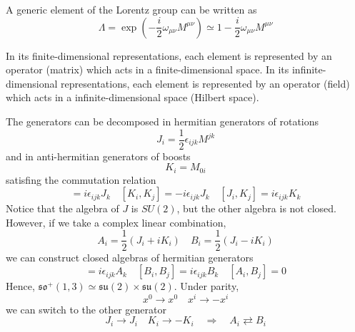     A generic element of the Lorentz group can be written as 
    \begin{equation*}
        \Lambda = \exp(-\frac{i}{2} \omega_{\mu\nu} M^{\mu\nu}) \simeq 1 - \frac{i}{2} \omega_{\mu\nu} M^{\mu\nu}
    \end{equation*}

    In its finite-dimensional representations, each element is represented by an operator (matrix) which acts in a finite-dimensional space. In its infinite-dimensional representations, each element is represented by an operator (field) which acts in a infinite-dimensional space (Hilbert space). 

    The generators can be decomposed in hermitian generators of rotations 
    \begin{equation*}
        J_i = \frac{1}{2} \epsilon_{ijk} M^{jk}
    \end{equation*}
    and in anti-hermitian generators of boosts
    \begin{equation*}
        K_i = M_{0i}
    \end{equation*}
    satisfing the commutation relation 
    \begin{equation*}
        [J_i, J_j] = i \epsilon_{ijk} J_k \quad [K_i, K_j] = - i \epsilon_{ijk} J_k \quad [J_i, K_j] = i \epsilon_{ijk} K_k
    \end{equation*}
    Notice that the algebra of $J$ is $SU(2)$, but the other algebra is not closed. However, if we take a complex linear combination, 
    \begin{equation*}
        A_i = \frac{1}{2} (J_i + i K_i) \quad B_i = \frac{1}{2} (J_i - i K_i)
    \end{equation*}
    we can construct closed algebras of hermitian generators
    \begin{equation*}
        [A_i, A_j] = i \epsilon_{ijk} A_k \quad [B_i, B_j] = i \epsilon_{ijk} B_k \quad [A_i, B_j] = 0
    \end{equation*}
    Hence, $\mathfrak{so}^+(1,3) \simeq \mathfrak{su}(2) \times \mathfrak{su}(2)$. Under parity,
    \begin{equation*}
        x^0 \rightarrow x^0 \quad x^i \rightarrow - x^i 
    \end{equation*}
    we can switch to the other generator
    \begin{equation*}
        J_i \rightarrow J_i \quad K_i \rightarrow - K_i \quad \Rightarrow \quad A_i \rightleftarrows B_i
    \end{equation*}

